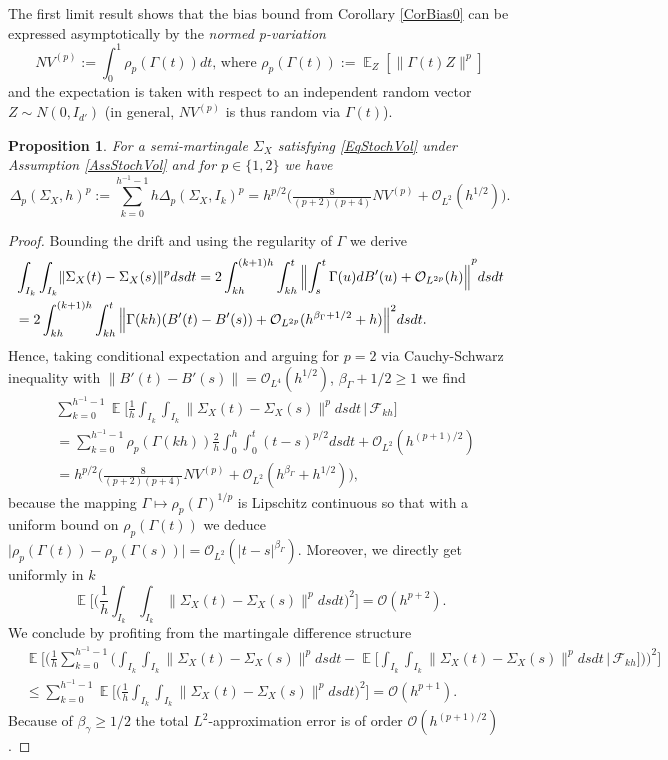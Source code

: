 \documentclass[preprint,aos]{imsart}
\numberwithin{equation}{section}
\newtheorem{proposition}[satz]{Proposition}
\theoremstyle{remark}
\DeclareMathOperator{\E}{{\mathbb E}}
\providecommand{\abs}[1]{\lvert #1 \rvert}
\providecommand{\norm}[1]{\lVert #1 \rVert}
\providecommand{\bnorm}[1]{{\Bigl\lVert #1 \Bigr\rVert}}
\renewcommand{\le}{\leqslant}
\renewcommand{\ge}{\geqslant}
\begin{document}
The first limit result shows that the bias bound from Corollary \ref{CorBias0} can be expressed asymptotically by the {\it normed p-variation}
\[NV^{(p)}:=\int_0^1\rho_p(\Gamma(t))dt\text{, where }\rho_p(\Gamma(t)):=\E_Z[\norm{\Gamma(t) Z}^p]\]
and the expectation is taken with respect to an independent random vector $Z\sim N(0,I_{d'})$ (in general, $NV^{(p)}$ is thus random via $\Gamma(t)$).

\begin{proposition}\label{PropNQV}
For a semi-martingale $\Sigma_X$ satisfying \eqref{EqStochVol} under Assumption \ref{AssStochVol} and for $p\in\{1,2\}$ we  have
\[ \Delta_p(\Sigma_X,h)^p:=\sum_{k=0}^{h^{-1}-1}h\Delta_p(\Sigma_X,I_k)^p=h^{p/2}\Big( \tfrac {8}{(p+2)(p+4)}NV^{(p)}+{\mathcal O}_{L^2}(h^{1/2})\Big).
\]
\end{proposition}

\begin{proof}
Bounding the drift and using the regularity of $\Gamma$ we derive
\begin{align*}
&\int_{I_k}\int_{I_k}\norm{\Sigma_X(t)-\Sigma_X(s)}^pdsdt = 2\int_{kh}^{(k+1)h}\int_{kh}^t\bnorm{\int_s^t\Gamma(u)dB'(u)+{\mathcal O}_{L^{2p}}(h)}^pdsdt\\
&=2\int_{kh}^{(k+1)h}\int_{kh}^t\bnorm{\Gamma(kh)(B'(t)-B'(s))+{\mathcal O}_{L^{2p}}(h^{\beta_\Gamma+1/2}+h)}^2dsdt.
\end{align*}
Hence, taking conditional expectation and arguing for $p=2$ via Cauchy-Schwarz inequality with $\norm{B'(t)-B'(s)}={\mathcal O}_{L^4}(h^{1/2})$, $\beta_{\Gamma}+1/2\ge 1$ we find
\begin{align*}
&\sum_{k=0}^{h^{-1}-1}\E\Big[\frac1{h}\int_{I_k}\int_{I_k}\norm{\Sigma_X(t)-\Sigma_X(s)}^pdsdt\,\Big|\,{\mathcal F}_{kh}\Big]\\
&=\sum_{k=0}^{h^{-1}-1}\rho_p(\Gamma(kh))\frac2h\int_0^h\int_0^t(t-s)^{p/2}dsdt+ {\mathcal O}_{L^2}(h^{(p+1)/2})\\
&=h^{p/2}\Big(\frac{8}{(p+2)(p+4)}NV^{(p)}+{\mathcal O}_{L^2}(h^{\beta_\Gamma}+h^{1/2})\Big),
\end{align*}
because the mapping $\Gamma\mapsto\rho_p(\Gamma)^{1/p}$ is Lipschitz continuous so that with a uniform bound on $\rho_p(\Gamma(t))$ we deduce $\abs{\rho_p(\Gamma(t))-\rho_p(\Gamma(s))}={\mathcal O}_{L^2}(\abs{t-s}^{\beta_\Gamma})$. Moreover, we directly get uniformly in $k$
\[ \E\Big[\Big(\frac1{h}\int_{I_k}\int_{I_k}\norm{\Sigma_X(t)-\Sigma_X(s)}^pdsdt\Big)^2\Big]={\mathcal O}(h^{p+2}).\]
We conclude by profiting from the martingale difference structure
\begin{align*}
&\E\Big[\Big(\frac1{h}\sum_{k=0}^{h^{-1}-1} \Big(\int_{I_k}\int_{I_k}\norm{\Sigma_X(t)-\Sigma_X(s)}^p dsdt- \E\Big[\int_{I_k}\int_{I_k}\norm{\Sigma_X(t)-\Sigma_X(s)}^pdsdt\,\Big|\,{\mathcal F}_{kh}\Big]\Big)\Big)^2\Big]\\
&\le \sum_{k=0}^{h^{-1}-1}\E\Big[\Big(\frac1{h}\int_{I_k}\int_{I_k}\norm{\Sigma_X(t)-\Sigma_X(s)}^pdsdt\Big)^2\Big]
={\mathcal O}(h^{p+1}).
\end{align*}
Because of $\beta_\gamma\ge 1/2$ the total $L^2$-approximation error is of order ${\mathcal O}(h^{(p+1)/2})$.
\end{proof}
\end{document}
